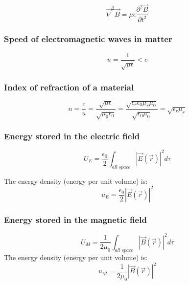 \documentclass[english,11pt]{article}
\begin{document}
\begin{equation*}
  \vec{\nabla}^{2} \vec{B} = \mu \epsilon \frac{\partial^{2} \vec{B}}{\partial t^{2}}
\end{equation*}

\subsubsection*{\bf Speed of electromagnetic waves in matter}
\begin{equation*}
  u = \frac{1}{\sqrt{\mu \epsilon}} < c
\end{equation*}


\subsubsection*{\bf Index of refraction of a material}
\begin{equation*}
  n = \frac{c}{u} =
    \frac{\sqrt{\mu \epsilon}}{\sqrt{\mu_{0} \epsilon_{0}}} =
    \frac{\sqrt{\epsilon_r \epsilon_0 \mu_r
        \mu_0}}{\sqrt{\epsilon_0 \mu_0}} = \sqrt{\epsilon_r \mu_r}
\end{equation*}


\subsubsection*{\bf Energy stored in the electric field}

\begin{equation*}
   U_{E} = \frac{\epsilon_0}{2} \int_{all\;space} |\vec{E}(\vec{r})|^2  d\tau
\end{equation*}

The energy density (energy per unit volume) is:
\begin{equation*}
  u_{E} = \frac{\epsilon_0}{2} |\vec{E}(\vec{r})|^2
\end{equation*}

\subsubsection*{\bf Energy stored in the magnetic field}

\begin{equation*}
   U_{M} = \frac{1}{2\mu_{0}} \int_{all\;space} |\vec{B}(\vec{r})|^2  d\tau
\end{equation*}
The energy density (energy per unit volume) is:
\begin{equation*}
  u_{M} = \frac{1}{2\mu_{0}} |\vec{B}(\vec{r})|^2
\end{equation*}
\end{document}
